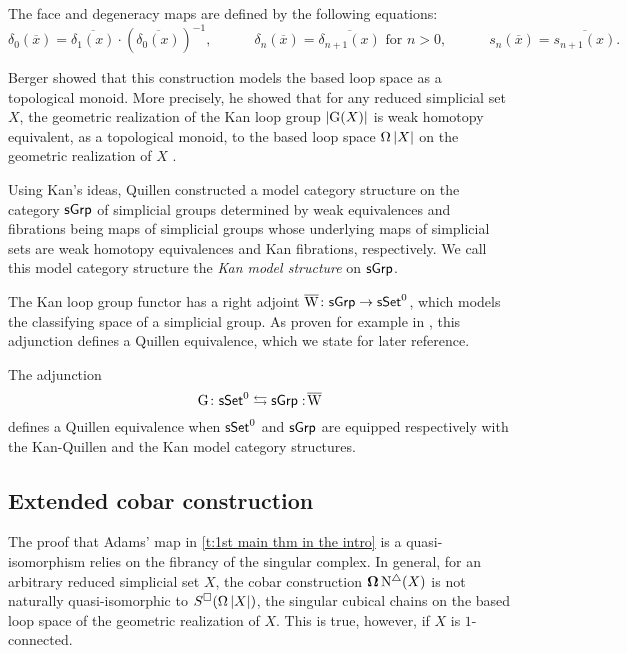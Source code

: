 The face and degeneracy maps are defined by the following equations:
\begin{equation*}
	\delta_0(\overline{x}) = \overline{\delta_1(x)} \cdot (\overline{\delta_0(x)})^{-1},
	\qquad \quad \delta_n(\overline{x}) = \overline{\delta_{n+1}(x)} \text{ for } n>0,
	\qquad \quad s_n(\overline{x}) = \overline{s_{n+1}(x)}.
\end{equation*}

Berger showed that this construction models the based loop space as a topological monoid.
More precisely, he showed that for any reduced simplicial set $X$, the geometric realization of the Kan loop group $\vert{\operatorname{G}(X)}\vert$ is weak homotopy equivalent, as a topological monoid, to the based loop space $\operatorname{\Omega} \vert{X}\vert$ on the geometric realization of $X$ \cite{berger1995loops}.

Using Kan's ideas, Quillen constructed a model category structure on the category $\mathsf{sGrp}$ of simplicial groups determined by
weak equivalences and fibrations being maps of simplicial groups whose underlying maps of simplicial sets are weak homotopy equivalences and Kan fibrations, respectively. 
We call this model category structure the \textit{Kan model structure} on $\mathsf{sGrp}$.

The Kan loop group functor has a right adjoint $\operatorname{\overline{W}} \colon \mathsf{sGrp} \to \mathsf{sSet}^0$, which models the classifying space of a simplicial group.
As proven for example in \cite[Chapter V]{goerss2009simplicial}, this adjunction defines a Quillen equivalence, which we state for later reference.

\begin{proposition} \label{p:kan adjuntion}
    The adjunction
	\begin{equation*}
	\operatorname{G} \colon \mathsf{sSet}^0 \leftrightarrows \mathsf{sGrp} :\! \operatorname{\overline{W}}
	\end{equation*}
	defines a Quillen equivalence when $\mathsf{sSet}^0$ and $\mathsf{sGrp}$ are equipped respectively with the Kan-Quillen and the Kan model category structures.
\end{proposition}

\subsection{Extended cobar construction}

The proof that Adams' map in \cref{t:1st main thm in the intro} is a quasi-isomorphism relies on the fibrancy of the singular complex.
In general, for an arbitrary reduced simplicial set $X$, the cobar construction $\operatorname{\mathbf{\Omega}} \operatorname{N^{\triangle}}(X)$ is not naturally quasi-isomorphic to $S^{\square}(\operatorname{\Omega}|X|)$, the singular cubical chains on the based loop space of the geometric realization of $X$.
This is true, however, if $X$ is $1$-connected.

